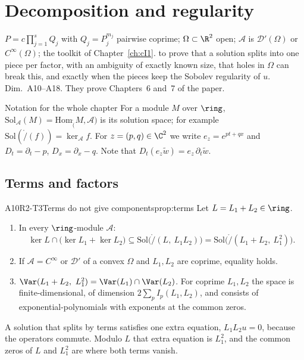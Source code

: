 \chapter{Decomposition and regularity}\label{ch:cI2}
\chapterbrief
{$P=c\prod_{j=1}^sQ_j$ with $Q_j=P_j^{m_j}$ pairwise coprime; $\Omega\subset\R^2$ open; $\mathcal A$ is $\mathcal D'(\Omega)$ or $C^\infty(\Omega)$; the toolkit of Chapter~\ref{ch:cI1}.}
{to prove that a solution splits into one piece per factor, with an ambiguity of exactly known size, that holes in $\Omega$ can break this, and exactly when the pieces keep the Sobolev regularity of $u$.}
{Dim.~A10--A18. They prove Chapters~6 and~7 of the paper.}

\begin{notebox}{Notation for the whole chapter}
For a module $M$ over $\ring$, $\mathrm{Sol}_{\mathcal A}(M)=\mathrm{Hom}_\ring(M,\mathcal A)$ is its solution space; for example $\mathrm{Sol}(\ring/(f))=\ker_{\mathcal A}f$. For $z=(p,q)\in\C^2$ we write $e_z=e^{pt+qx}$ and $D_t=\partial_t-p$, $D_x=\partial_x-q$. Note that $D_t(e_z\tilde w)=e_z\,\partial_t\tilde w$.
\end{notebox}

\section{Terms and factors}

\begin{dimcard}{A10}{R2-T3}{Terms do not give components}{\proved}{prop:terms}
Let $L=L_1+L_2\in\ring$.
\begin{enumerate}[label=(\alph*)]
\item In every $\ring$-module $\mathcal A$:
\[
\ker L\cap\big(\ker L_1+\ker L_2\big)\subseteq\mathrm{Sol}\big(\ring/(L,\ L_1L_2)\big)=\mathrm{Sol}\big(\ring/(L_1+L_2,\ L_1^2)\big).
\]
\item If $\mathcal A=C^\infty$ or $\mathcal D'$ of a convex $\Omega$ and $L_1,L_2$ are coprime, equality holds.
\item $\Var(L_1+L_2,\ L_1^2)=\Var(L_1)\cap\Var(L_2)$. For coprime $L_1,L_2$ the space is finite-dimensional, of dimension $2\sum_pI_p(L_1,L_2)$, and consists of exponential-polynomials with exponents at the common zeros.
\end{enumerate}
\end{dimcard}

\begin{proofidea}
A solution that splits by terms satisfies one extra equation, $L_1L_2u=0$, because the operators commute. Modulo $L$ that extra equation is $L_1^2$, and the common zeros of $L$ and $L_1^2$ are where both terms vanish.
\end{proofidea}

